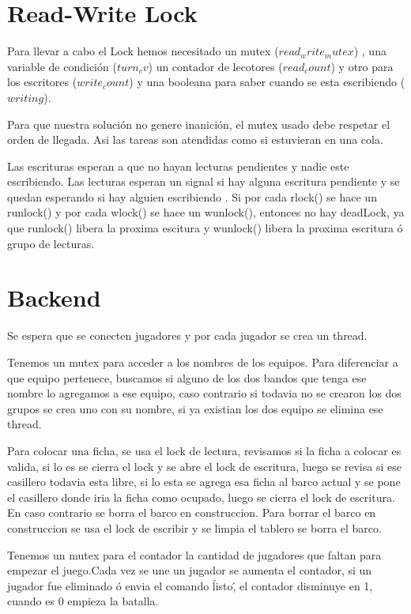 \documentclass[a4paper]{article}
\begin{document}

\maketitle
\thispagestyle{empty}

\newpage
\tableofcontents

\newpage
\section{Read-Write Lock}
Para llevar a cabo el Lock hemos necesitado un mutex ($read_write_mutex$) , una
variable de condición ($turn_cv$) un contador de lecotores ($read_count$) y otro
para los escritores ($write_count$) y una booleana para saber cuando se esta
escribiendo ($writing$).

Para que nuestra solución no genere inanición, el mutex usado debe respetar el
orden de llegada. Asi las tareas son atendidas como si estuvieran en una cola.

Las escrituras esperan a que no hayan lecturas pendientes y nadie este
escribiendo. Las lecturas esperan un signal si hay alguna escritura pendiente y
se quedan esperando si hay alguien escribiendo .  Si por cada rlock() se hace un
runlock() y por cada wlock() se hace un wunlock(), entonces no hay deadLock, ya
que runlock() libera la proxima escitura y wunlock() libera la proxima escritura
ó grupo de lecturas.


\section{Backend}
Se espera que se conecten jugadores y por cada jugador se crea un thread.

Tenemos un mutex para acceder a los nombres de los equipos. Para diferenciar a
que equipo pertenece,  buscamos si alguno de los dos bandos que tenga ese nombre
lo agregamos a ese equipo, caso contrario si todavia no se crearon los dos
grupos se crea uno con su nombre, si ya existian los dos equipo se elimina ese
thread.

Para colocar una ficha, se usa el lock de lectura, revisamos si la ficha a
colocar es valida, si lo es se cierra el lock y se abre el lock de escritura,
luego se revisa si ese casillero todavia esta libre, si lo esta se agrega esa
ficha al barco actual y se pone el casillero donde iria la ficha como ocupado,
luego se cierra el lock de escritura. En caso contrario se borra el barco en
construccion.  Para borrar el barco en construccion se usa el lock de escribir y
se limpia el tablero se borra el barco.

Tenemos un mutex para el contador la cantidad de jugadores que faltan para
empezar el juego.Cada vez se une un jugador se aumenta el contador, si un
jugador fue eliminado ó envia el comando \'listo\', el contador disminuye en 1,
cuando  es $0$ empieza la batalla.
\end{document}
